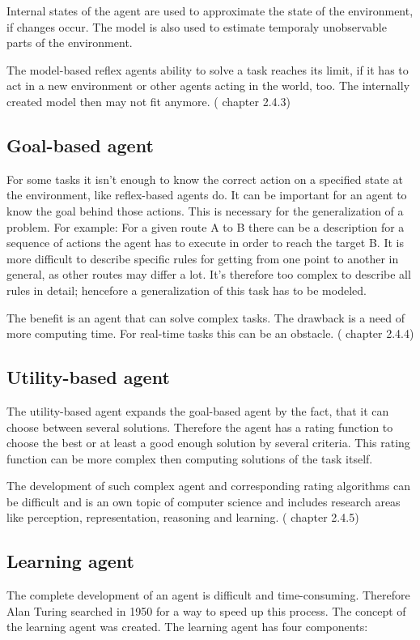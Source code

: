 \documentclass[10pt,a4paper,DIV=11]{scrreprt}
\begin{document}
Internal states of the agent are used to approximate the state of the environment, if changes occur. 
The model is also used to estimate temporaly unobservable parts of the environment.

The model-based reflex agents ability to solve a task reaches its limit, if it has to act in a new environment or other agents acting in the world, too. The internally created model then may not fit anymore.
(\cite{ai} chapter 2.4.3)

\subsection{Goal-based agent}
For some tasks it isn't enough to know the correct action on a specified state at the environment, like reflex-based agents do. It can be important for an agent to know the goal behind those actions. This is necessary for the generalization of a problem. For example: For a given route A to B there can be a description for a sequence of actions the agent has to execute in order to reach the target B. It is more difficult to describe specific rules for getting from one point to another in general, as other routes may differ a lot. It's therefore too complex to describe all rules in detail; hencefore a generalization of this task has to be modeled.

The benefit is an agent that can solve complex tasks. The drawback is a need of more computing time. For real-time tasks this can be an obstacle.
(\cite{ai} chapter 2.4.4)

\subsection{Utility-based agent}
The utility-based agent expands the goal-based agent by the fact, that it can choose between several solutions. Therefore the agent has a rating function to choose the best or at least a good enough solution by several criteria. This rating function can be more complex then computing solutions of the task itself.

The development of such complex agent and corresponding rating algorithms can be difficult and is an own topic of computer science and includes research areas like perception, representation, reasoning and learning.
(\cite{ai} chapter 2.4.5)

\subsection{Learning agent}
The complete development of an agent is difficult and time-consuming. Therefore Alan Turing searched in 1950 for a way to speed up this process.\cite{turing} The concept of the learning agent was created. The learning agent has four components: \\
\end{document}
